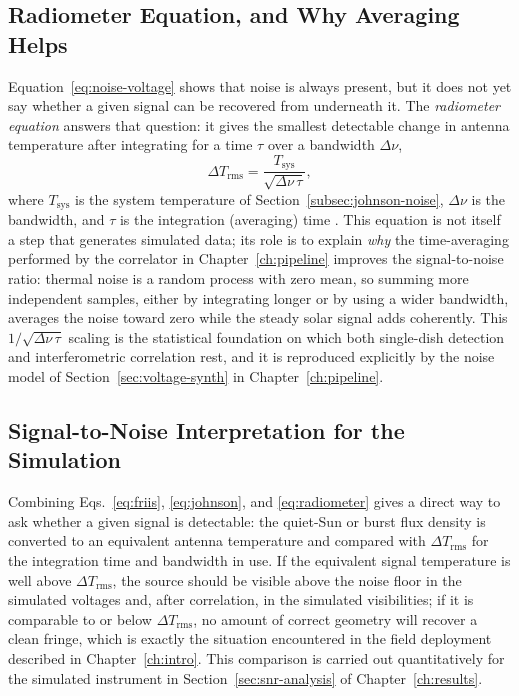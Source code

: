 \subsection{Radiometer Equation, and Why Averaging Helps}
\label{subsec:radiometer}
Equation~\eqref{eq:noise-voltage} shows that noise is always present, but it
does not yet say whether a given signal can be recovered from underneath it.
The \emph{radiometer equation} answers that question: it gives the smallest
detectable change in antenna temperature after integrating for a time $\tau$
over a bandwidth $\Delta\nu$,
\begin{equation}
  \Delta T_\mathrm{rms} = \frac{T_\mathrm{sys}}{\sqrt{\Delta\nu\,\tau}} ,
  \label{eq:radiometer}
\end{equation}
where $T_\mathrm{sys}$ is the system temperature of
Section~\ref{subsec:johnson-noise}, $\Delta\nu$ is the bandwidth, and $\tau$
is the integration (averaging) time \citep{tms2017,kraus1986}. This equation
is not itself a step that generates simulated data; its role is to explain
\emph{why} the time-averaging performed by the correlator in
Chapter~\ref{ch:pipeline} improves the signal-to-noise ratio: thermal noise
is a random process with zero mean, so summing more independent samples,
either by integrating longer or by using a wider bandwidth, averages the
noise toward zero while the steady solar signal adds coherently. This
$1/\sqrt{\Delta\nu\,\tau}$ scaling is the statistical foundation on which both
single-dish detection and interferometric correlation rest, and it is
reproduced explicitly by the noise model of Section~\ref{sec:voltage-synth} in
Chapter~\ref{ch:pipeline}.

\subsection{Signal-to-Noise Interpretation for the Simulation}
\label{subsec:snr-interpretation}
Combining Eqs.~\eqref{eq:friis}, \eqref{eq:johnson}, and \eqref{eq:radiometer}
gives a direct way to ask whether a given signal is detectable: the quiet-Sun
or burst flux density is converted to an equivalent antenna temperature and
compared with $\Delta T_\mathrm{rms}$ for the integration time and bandwidth
in use. If the equivalent signal temperature is well above $\Delta
T_\mathrm{rms}$, the source should be visible above the noise floor in the
simulated voltages and, after correlation, in the simulated visibilities; if
it is comparable to or below $\Delta T_\mathrm{rms}$, no amount of correct
geometry will recover a clean fringe, which is exactly the situation
encountered in the field deployment described in Chapter~\ref{ch:intro}. This
comparison is carried out quantitatively for the simulated instrument in
Section~\ref{sec:snr-analysis} of Chapter~\ref{ch:results}.

